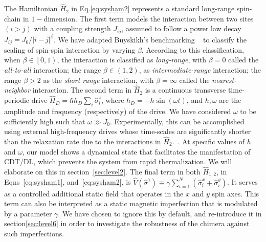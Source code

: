 \documentclass[%
nofootinbib,
reprint,
superscriptaddress,
amsmath,amssymb,showkeys,
aps,
prb,
]{revtex4-2}
\begin{document}
	The Hamiltonian $\hat{H}_2$ in Eq.\eqref{eq:sysham2} represents a standard long-range spin-chain in $1-$dimension. The first term models the interaction between two sites $(i>j)$ with a coupling strength $J_{ij}$, assumed to follow a power law decay $J_{ij}={J_0}/{|i-j|^\beta}$. We have adapted Buyskikh's benchmarking ~\cite{buyskikh_entanglement_2016} to classify the scaling of spin-spin interaction by varying $\beta$. According to this classification, when $\beta\in\left[0,1\right)$, the interaction is classified as \textit{long-range}, with $\beta=0$ called the \textit{all-to-all} interaction; the range $\beta\in \left(1,2\right)$, as \textit{intermediate-range} interaction; the range $\beta > 2$ as the  \textit{short range} interaction, with $\beta= \infty$ called the \textit{nearest-neighbor} interaction. The second term in $\hat{H}_2$ is a continuous transverse time-periodic drive $\displaystyle \hat{H}_D=\hbar h_D \sum_i\hat{\sigma}^z_i$, where $\displaystyle h_D = -h\sin{(\omega t)}$, and $h,\omega$ are the amplitude and frequency (respectively) of the drive. We have considered $\omega$ to be sufficiently high such that $\omega\gg J_0$. 	Experimentally, this can be accomplished using external high-frequency drives whose time-scales are significantly shorter than the relaxation rate due to the interactions in $\hat{H}_2$.~\cite{choi_observation_2017,zhang_observation_2017,Cirac_1995,Blatt_2012}. At specific values of $h$ and $\omega$, our model shows a dynamical state that facilitates the manifestation of CDT/DL, which prevents the system from rapid thermalization. We will elaborate on this in section~\ref{sec:level2}. The final term in both $\hat{H}_{1,2}$, in Eqns~\ref{eq:sysham1}, and~\ref{eq:sysham2}, is $\displaystyle \hat{V}(\hat{\sigma}^{\gamma}) \equiv\gamma  \sum_{i=1}^{N} (\hat{\sigma}^x_i + \hat{\sigma}^y_i)$. It serves as a controlled additional static field that operates in the $x$ and $y$ spin axes.  This term can also be interpreted as a static magnetic imperfection that is modulated by a parameter $\gamma$. We have chosen to ignore this by default, and re-introduce it in section\ref{sec:level6} in order to investigate the robustness of the chimera against such imperfections.
	
\end{document}
